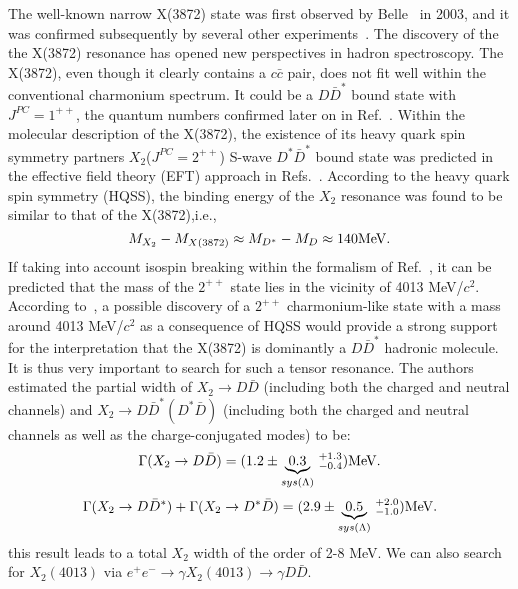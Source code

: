 \documentclass[aps,preprint,tightenlines,superscriptaddress,showpacs,byrevtex,amsmath,amssymb,nofloatfix]{revtex4}
\begin{document}
The well-known narrow X(3872) state was first observed by Belle~\cite{X3872} in 2003, and it was confirmed subsequently by several other experiments~\cite{CDFX3872,D0X3872,BABARX3872}. The discovery of the the X(3872) resonance has opened new perspectives in hadron spectroscopy. The X(3872), even though it clearly contains a $c\bar{c}$ pair, does not fit well within the conventional charmonium spectrum. It could be a $D\bar{D}^{*}$ bound state with $J^{PC} = 1^{++}$, the quantum numbers confirmed later on in Ref.~\cite{X3872JPC}. Within the molecular description of the X(3872), the existence of its heavy quark spin symmetry partners $X_{2}$($J^{PC} = 2^{++}$) S-wave $D^{*}\bar{D}^{*}$ bound state was predicted in the effective field theory (EFT) approach in Refs.~\cite{PRD056004,PRD076006}. According to the heavy quark spin symmetry (HQSS), the binding energy of the $X_{2}$ resonance was found to be similar to that of the X(3872),i.e.,
\begin{equation}\label{MX2-MX3872}
  M_{X_{2}}-M_{X(3872)} \approx M_{D^{*}}-M_{D} \approx 140 {\rm MeV}.
\end{equation}
If taking into account isospin breaking within the formalism of Ref.~\cite{PRD014029}, it can be predicted that the mass of the $2^{++}$ state lies in the vicinity of 4013 MeV/$c^{2}$. According to~\cite{DecaywidthX4013}, a possible discovery of a $2^{++}$ charmonium-like state with a mass around 4013 MeV/$c^{2}$ as a consequence of HQSS would provide a strong support for the interpretation that the X(3872) is dominantly a $D\bar{D}^{*}$ hadronic molecule. It is thus very important to search for such a tensor resonance. The authors estimated the partial width of $X_{2}\rightarrow D\bar{D}$ (including both the charged and neutral channels) and $X_{2}\rightarrow D\bar{D}^{*}(D^{*}\bar{D})$ (including both the charged and neutral channels as well as the charge-conjugated modes) to be:
\begin{equation}\label{X2partialwidth}
  \Gamma(X_{2}\rightarrow D\bar{D})=(1.2\pm {\underbrace{0.3}_{sys(\Lambda)}}~_{-0.4}^{+1.3}) {\rm MeV}.
\end{equation}
\begin{equation}\label{X2partialwidth}
  \Gamma(X_{2}\rightarrow D\bar{D}^{*}) + \Gamma(X_{2}\rightarrow D^{*}\bar{D}) =(2.9\pm {\underbrace{0.5}_{sys(\Lambda)}}~_{-1.0}^{+2.0}) {\rm MeV}.
\end{equation}
this result leads to a total $X_{2}$ width of the order of 2-8 MeV. We can also search for $X_{2}(4013)$ via $e^{+}e^{-}\rightarrow \gamma X_{2}(4013) \rightarrow \gamma D\bar{D}$.
\end{document}
